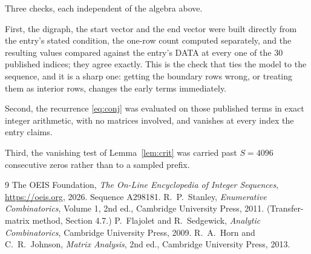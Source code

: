 \documentclass[11pt,a4paper]{article}
\theoremstyle{plain}
\theoremstyle{definition}
\begin{document}
Three checks, each independent of the algebra above.

First, the digraph, the start vector and the end vector were built directly from the
entry's stated condition, the one-row count computed separately, and the resulting values
compared against the entry's DATA at every one of the $30$ published indices; they
agree exactly. This is the check that ties the model to the sequence, and it is a sharp one:
getting the boundary rows wrong, or treating them as interior rows, changes the early terms
immediately.

Second, the recurrence \eqref{eq:conj} was evaluated on those published terms in exact
integer arithmetic, with no matrices involved, and vanishes at every index the entry claims.

Third, the vanishing test of Lemma~\ref{lem:crit} was carried past $S=4096$ consecutive
zeros rather than to a sampled prefix.

\begin{thebibliography}{9}
 The OEIS Foundation, \emph{The On-Line Encyclopedia of Integer
Sequences}, \url{https://oeis.org}, 2026. Sequence A298181.
 R.~P.~Stanley, \emph{Enumerative Combinatorics}, Volume 1, 2nd ed.,
Cambridge University Press, 2011. (Transfer-matrix method, Section 4.7.)
 P.~Flajolet and R.~Sedgewick, \emph{Analytic Combinatorics}, Cambridge
University Press, 2009.
 R.~A.~Horn and C.~R.~Johnson, \emph{Matrix Analysis}, 2nd ed., Cambridge
University Press, 2013.
\end{thebibliography}
\end{document}
